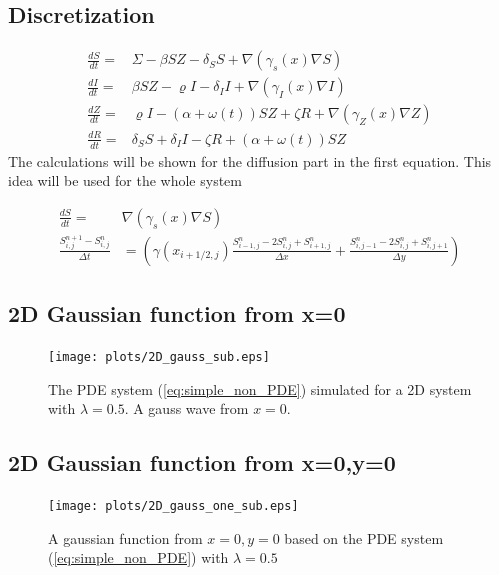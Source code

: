 \documentclass[%
twoside,                 %
final,                   %
10pt]{article}
\begin{document}
\subsection{Discretization}
\begin{equation} \label{eq:LMR_model}
	\begin{aligned} 
	\frac{dS}{dt} =& \Sigma -\beta SZ - \delta_SS + \nabla(\gamma_s(x)\nabla S) \\
	\frac{dI}{dt} =& \beta SZ - \varrho I - \delta_II+\nabla(\gamma_I(x)\nabla I)\\
	\frac{dZ}{dt} =& \varrho I- (\alpha+\omega(t))SZ + \zeta R+ \nabla(\gamma_Z(x)\nabla Z)\\
	\frac{dR}{dt} =& \delta_SS +\delta_II -\zeta R + (\alpha+\omega(t))SZ 
	\end{aligned}
\end{equation}
The calculations will be shown for the diffusion part in the first equation. This idea will be used for the whole system

\begin{equation}
	\begin{aligned}
	\frac{dS}{dt} =& \nabla(\gamma_s(x)\nabla S) \\
    \frac{S^{n+1}_{i,j}-S^n_{i,j}}{\Delta t} &= \left(\gamma(x_{i+1/2,j})\frac{S^{n}_{i-1,j}-2S^{n}_{i,j}+S^{n}_{i+1,j}}{\Delta x}+\frac{S^{n}_{i,j-1}-2S^{n}_{i,j}+S^{n}_{i,j+1}}{\Delta y}\right) 
	\end{aligned}
\end{equation}
\subsection{2D Gaussian function from x=0}


\begin{figure}[ht]
  \centerline{\texttt{[image: plots/2D\_gauss\_sub.eps]}}
  \caption{
  The PDE system (\ref{eq:simple_non_PDE}) simulated for a 2D system with $\lambda=0.5$. A gauss wave from $x=0$.
  }
\end{figure}


\subsection{2D Gaussian function from x=0,y=0}


\begin{figure}[ht]
  \centerline{\texttt{[image: plots/2D\_gauss\_one\_sub.eps]}}
  \caption{
  A gaussian function from $x=0,y=0$ based on the PDE system (\ref{eq:simple_non_PDE}) with $\lambda=0.5$
  }
\end{figure}
\end{document}
